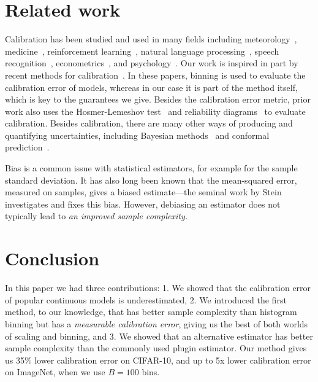 \section{Related work}

Calibration has been studied and used in many fields including meteorology~\cite{murphy1973vector, murphy1977reliability, degroot1983forecasters,gneiting2005weather, brocker2009decomposition}, medicine~\cite{jiang2012calibrating, crowson2017calibration, harrell1996prognostic}, reinforcement learning~\cite{malik2019calibrated}, natural language processing~\cite{nguyen2015posterior, card2018calibration}, speech recognition~\cite{dong2011calibration}, econometrics~\cite{gneiting2007probabilistic}, and psychology~\cite{lichtenstein1982calibration}. Our work is inspired in part by recent methods for calibration~\cite{guo2017calibration, kuleshov2018accurate, hendrycks2019anomaly}. In these papers, binning is used to evaluate the calibration error of models, whereas in our case it is part of the method itself, which is key to the guarantees we give. Besides the calibration error metric, prior work also uses the Hosmer-Lemeshov test~\cite{hosmer1980goodness} and reliability diagrams~\cite{degroot1983forecasters, brocker2007reliability} to evaluate calibration. Besides calibration, there are many other ways of producing and quantifying uncertainties, including Bayesian methods~\cite{gelman1995bayesian} and conformal prediction~\cite{shafer2008tutorial, lei2016distribution}.

Bias is a common issue with statistical estimators, for example for the sample standard deviation. It has also long been known that the mean-squared error, measured on samples, gives a biased estimate---the seminal work by Stein~\cite{stein81sure} investigates and fixes this bias. However, debiasing an estimator does not typically lead to \emph{an improved sample complexity.}


\section{Conclusion}

In this paper we had three contributions: 1. We showed that the calibration error of popular continuous models is underestimated, 2. We introduced the first method, to our knowledge, that has better sample complexity than histogram binning but has a \emph{measurable calibration error}, giving us the best of both worlds of scaling and binning, and 3. We showed that an alternative estimator has better sample complexity than the commonly used plugin estimator. Our method gives us 35\% lower calibration error on CIFAR-10, and up to 5x lower calibration error on ImageNet, when we use $B = 100$ bins.


